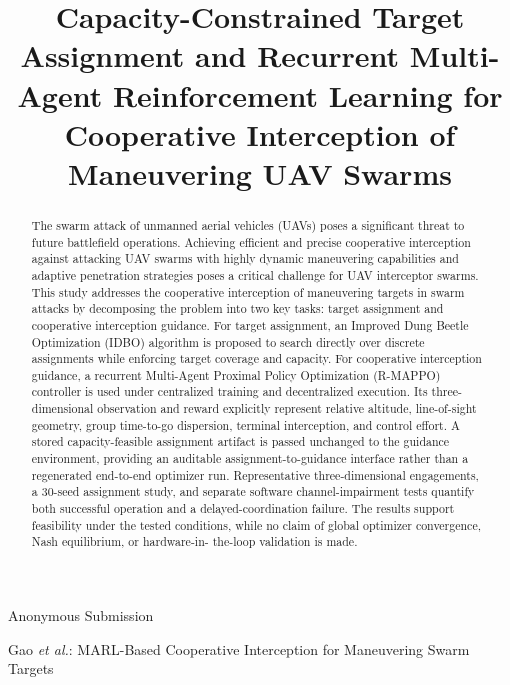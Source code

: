 \documentclass[lettersize,journal]{IEEEtran}
\begin{document}
\title{Capacity-Constrained Target Assignment and Recurrent Multi-Agent Reinforcement Learning for Cooperative Interception of Maneuvering UAV Swarms}


\author{}
%
{Anonymous Submission}

%
{Gao \MakeLowercase{\textit{et al.}}: MARL-Based Cooperative Interception for Maneuvering Swarm Targets}

\maketitle

\begin{abstract}
The swarm attack of unmanned aerial vehicles (UAVs) poses a significant threat to future
battlefield operations.
Achieving efficient and precise cooperative interception against attacking UAV swarms with
highly dynamic maneuvering capabilities and adaptive penetration strategies poses a critical
challenge for UAV interceptor swarms.
This study addresses the cooperative interception of maneuvering targets in swarm attacks by
decomposing the problem into two key tasks: target assignment and cooperative interception
guidance.
For target assignment, an Improved Dung Beetle Optimization (IDBO) algorithm is proposed to
search directly over discrete assignments while enforcing target coverage and capacity.
For cooperative interception guidance, a recurrent Multi-Agent Proximal Policy Optimization
(R-MAPPO) controller is used under centralized training and decentralized execution. Its
three-dimensional observation and reward explicitly represent relative altitude, line-of-sight
geometry, group time-to-go dispersion, terminal interception, and control effort. A stored
capacity-feasible assignment artifact is passed unchanged to the guidance environment,
providing an auditable assignment-to-guidance interface rather than a regenerated end-to-end
optimizer run. Representative three-dimensional engagements, a 30-seed
assignment study, and separate software channel-impairment tests quantify both successful
operation and a delayed-coordination failure. The results support feasibility under the tested
conditions, while no claim of global optimizer convergence, Nash equilibrium, or hardware-in-
the-loop validation is made.
\end{abstract}
\end{document}
